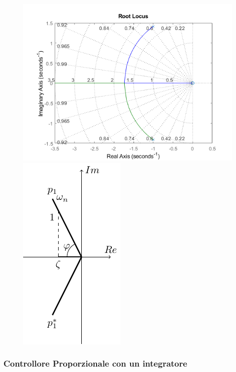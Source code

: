 \documentclass{article}
\numberwithin{equation}{subsection}
\begin{document}
\begin{figure}[H]%
    \centering
    \includegraphics[scale=0.55]{rlocus}%
    \qquad
    \includegraphics{rlocus-2.pdf}%
\end{figure}

\subsubsection{Controllore Proporzionale con un integratore}
\end{document}
